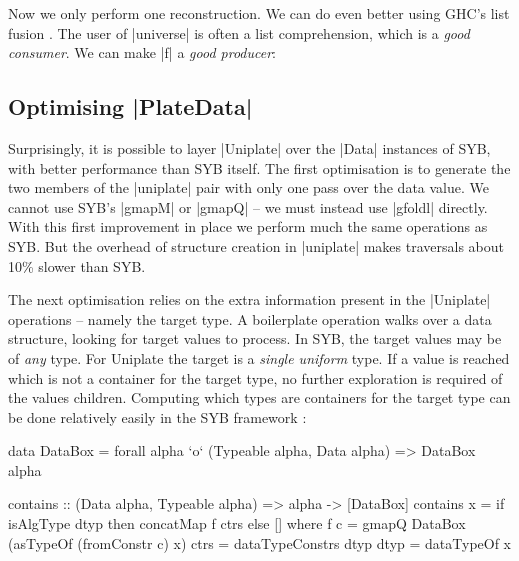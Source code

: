 Now we only perform one reconstruction. We can do even better using GHC's list fusion \cite{spj:rules}. The user of |universe| is often a list comprehension, which is a \textit{good consumer}. We can make |f| a \textit{good producer}:


\subsection{Optimising |PlateData|}
\label{secU:optimise_playdata}

Surprisingly, it is possible to layer |Uniplate| over the |Data| instances of SYB, with better performance than SYB itself. The first optimisation is to generate the two members of the |uniplate| pair with only one pass over the data value. We cannot use SYB's |gmapM| or |gmapQ| -- we must instead use |gfoldl| directly. With this first improvement in place we perform much the same operations as SYB. But the overhead of structure creation in |uniplate| makes traversals about 10\% slower than SYB.

The next optimisation relies on the extra information present in the |Uniplate| operations -- namely the target type. A boilerplate operation walks over a data structure, looking for target values to process. In SYB, the target values may be of \textit{any} type. For Uniplate the target is a \textit{single uniform} type. If a value is reached which is not a container for the target type, no further exploration is required of the values children. Computing which types are containers for the target type can be done relatively easily in the SYB framework \citep{lammel:syb2}:


\begin{onepage}
\ignore\begin{code}
data DataBox = forall alpha `o` (Typeable alpha, Data alpha) => DataBox alpha

contains :: (Data alpha, Typeable alpha) => alpha -> [DataBox]
contains x = if isAlgType dtyp then concatMap f ctrs else []
    where
        f c = gmapQ DataBox (asTypeOf (fromConstr c) x)
        ctrs = dataTypeConstrs dtyp
        dtyp = dataTypeOf x
\end{code}
\end{onepage}

